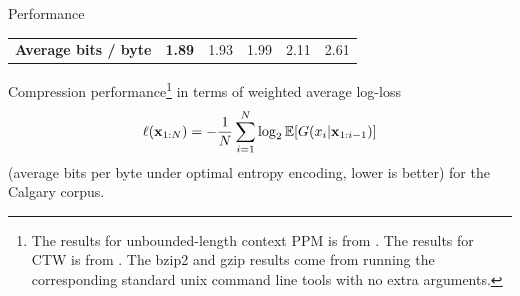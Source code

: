 \documentclass[16pt]{beamer}
\begin{document}
{\begin{block}{Performance}
\begin{table}[t]
\begin{center}
\begin{tabular}{l||r|c|c|c|c}
\textbf{Average bits / byte}      &{\bf 1.89}   & 1.93  &  1.99 & 2.11 & 2.61 \\%
\end{tabular}
\end{center}
\label{table:results}
\end{table}
\end{block}
Compression performance\footnote{The results for unbounded-length context PPM is from 
\cite{Cleary1997b}. The results for CTW is from \cite{Willems2009}.   The
bzip2 and gzip results come from running the corresponding standard unix
command line tools with no extra arguments.} in terms of weighted average log-loss
\[\ell(\xbf_{1:N}) = -\frac{1}{N}\sum_{i=1}^N \log_2 \EE[G(x_i|\xbf_{1:i-1})]\]
(average bits per byte under optimal entropy encoding, lower is better) for
the Calgary corpus.


}
\end{document}
